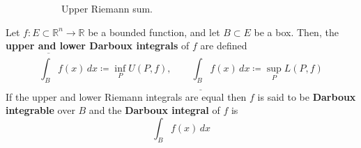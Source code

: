 \begin{definition}
\begin{figure}[H]
\begin{subfigure}[b]{0.48\textwidth}
        \caption{Upper Riemann sum.}
        \label{fig:upper_riemann_rum}
      \end{subfigure}
      \caption{}
    \end{figure}
  \end{definition}

  \begin{definition}
		Let $f: E \subset \mathbb{R}^n \to \mathbb{R}$ be a bounded function, and let $B \subset E$ be a box. Then, the \textbf{upper and lower Darboux integrals} of $f$ are defined 
    \begin{equation}
      \overline{\int_B} f(x) \,dx \coloneqq \inf_P U(P, f), \qquad \underline{\int_B} f(x) \,dx \coloneqq \sup_P L(P, f) 
    \end{equation}
    If the upper and lower Riemann integrals are equal then $f$ is said to be \textbf{Darboux integrable} over $B$ and the \textbf{Darboux integral} of $f$ is 
    \begin{equation}
      \int_B f(x) \,dx 
    \end{equation}
  \end{definition} 

